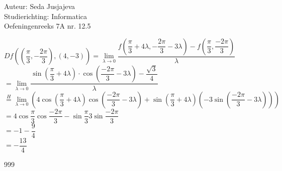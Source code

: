 \documentclass[a4paper]{article}
\newcommand{\limit}{\lim\limits}
\begin{document}
\noindent \large Auteur: Seda Jusjajeva\\
\noindent \large Studierichting: Informatica\\
\noindent \large Oefeningenreeks 7A nr. 12.5\\

\medskip

\normalsize


$Df\left(\left(\dfrac{\pi}{3}, -\dfrac{2\pi}{3}\right), (4, -3)\right) = \limit_{\lambda \to 0} \dfrac{f\left(\dfrac{\pi}{3} + 4\lambda, -\dfrac{2\pi}{3} - 3\lambda\right) - f\left(\dfrac{\pi}{3},\dfrac{-2\pi}{3}\right)}{\lambda}$ \\

$= \limit_{\lambda \to 0} \dfrac{\sin\left(\dfrac{\pi}{3} + 4\lambda\right) \cdot \cos\left(\dfrac{-2\pi}{3} - 3\lambda\right) - \dfrac{\sqrt{3}}{4}}{\lambda}$ \\

$\overset{H}{=} \limit_{\lambda \rightarrow 0} \left(4\cos\left(\dfrac{\pi}{3} + 4\lambda\right)\cos\left(\dfrac{-2\pi}{3} - 3\lambda\right) + \sin\left(\dfrac{\pi}{3} + 4\lambda\right)\left(-3\sin\left(\dfrac{-2\pi}{3} - 3\lambda\right)\right)\right)$ \\

$= 4\cos\dfrac{\pi}{3}\cos\dfrac{-2\pi}{3} - \sin\dfrac{\pi}{3}3\sin\dfrac{-2\pi}{3}$ \\

$= -1 - \dfrac{9}{4}$ \\

$= -\dfrac{13}{4}$ \\



\begin{thebibliography}{999}
\end{thebibliography}
\end{document}
